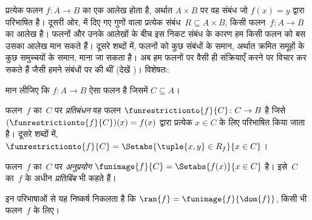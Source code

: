 \documentclass[../../../include/open-logic-section]{subfiles}
\begin{document}
\begin{explain}
प्रत्येक फलन $f\colon A \to B$ का एक आलेख होता है, अर्थात $A
\times B$ पर वह संबंध जो $f(x) = y$ द्वारा परिभाषित है। दूसरी ओर,
 में दिए गए गुणों वाला प्रत्येक संबंध~$R
\subseteq A \times B$, किसी फलन~$f \colon A \to
B$ का आलेख है। फलनों और
उनके आलेखों के बीच इस निकट संबंध के कारण हम किसी फलन को बस उसका आलेख मान सकते
हैं। दूसरे शब्दों में, फलनों को कुछ संबंधों के समान, अर्थात क्रमित समूहों के
कुछ समुच्चयों के समान, माना जा सकता है।
 अब हम फलनों पर
वैसी ही संक्रियाएँ करने पर विचार कर सकते हैं जैसी हमने संबंधों पर की थीं
(देखें )। विशेषतः:
\end{explain}

\begin{defn}
मान लीजिए कि $f \colon A \to B$ ऐसा फलन है जिसमें $C\subseteq A$।

फलन~$f$ का~$C$ पर \emph{प्रतिबंधन} वह फलन
$\funrestrictionto{f}{C}\colon C \to B$ है जिसे
$(\funrestrictionto{f}{C})(x) = f(x)$ द्वारा प्रत्येक $x \in C$ के लिए
परिभाषित किया जाता है। दूसरे
शब्दों में, $\funrestrictionto{f}{C} = \Setabs{\tuple{x, y} \in R_f}{x \in
C}$।

फलन~$f$ का~$C$ पर \emph{अनुप्रयोग} $\funimage{f}{C} =
\Setabs{f(x)}{x \in C}$ है। इसे~$C$ का~$f$ के अधीन \emph{प्रतिबिंब} भी कहते
हैं।
\end{defn}

\begin{explain}
इन परिभाषाओं से यह निष्कर्ष निकलता है कि $\ran{f} =
\funimage{f}{\dom{f}}$, किसी भी फलन~$f$ के लिए।
\end{explain}
\end{document}
